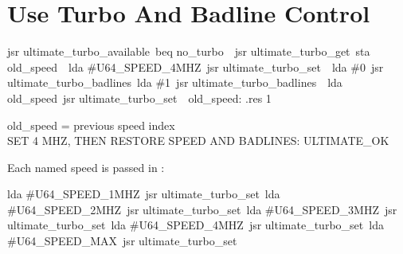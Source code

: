 
\section{Use Turbo And Badline Control}

\begin{listingbox}
\hspace*{2em}jsr ultimate\_turbo\_available\
\hspace*{2em}beq no\_turbo\
\
\hspace*{2em}jsr ultimate\_turbo\_get\
\hspace*{2em}sta old\_speed\
\
\hspace*{2em}lda \#U64\_SPEED\_4MHZ\
\hspace*{2em}jsr ultimate\_turbo\_set\
\
\hspace*{2em}lda \#0\
\hspace*{2em}jsr ultimate\_turbo\_badlines\
\hspace*{2em}lda \#1\
\hspace*{2em}jsr ultimate\_turbo\_badlines\
\
\hspace*{2em}lda old\_speed\
\hspace*{2em}jsr ultimate\_turbo\_set\
\
old\_speed: .res 1
\end{listingbox}

\begin{resultbox}
old_speed = previous speed index\\
SET 4 MHZ, THEN RESTORE SPEED AND BADLINES: ULTIMATE_OK
\end{resultbox}

Each named speed is passed in :

\begin{listingbox}
\hspace*{2em}lda \#U64\_SPEED\_1MHZ\
\hspace*{2em}jsr ultimate\_turbo\_set\
\hspace*{2em}lda \#U64\_SPEED\_2MHZ\
\hspace*{2em}jsr ultimate\_turbo\_set\
\hspace*{2em}lda \#U64\_SPEED\_3MHZ\
\hspace*{2em}jsr ultimate\_turbo\_set\
\hspace*{2em}lda \#U64\_SPEED\_4MHZ\
\hspace*{2em}jsr ultimate\_turbo\_set\
\hspace*{2em}lda \#U64\_SPEED\_MAX\
\hspace*{2em}jsr ultimate\_turbo\_set
\end{listingbox}

